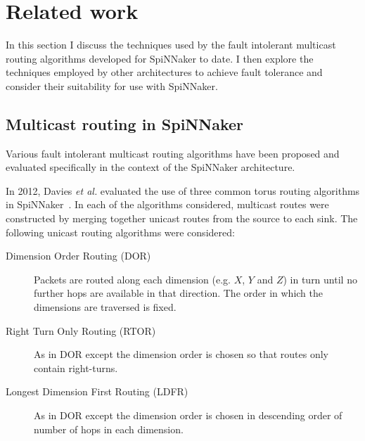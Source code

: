 	\section{Related work}
		
		In this section I discuss the techniques used by the fault intolerant
		multicast routing algorithms developed for SpiNNaker to date. I then
		explore the techniques employed by other architectures to achieve fault
		tolerance and consider their suitability for use with SpiNNaker.
		
		\subsection{Multicast routing in SpiNNaker}
			
			Various fault intolerant multicast routing algorithms have been
			proposed and evaluated specifically in the context of the SpiNNaker
			architecture.
			
			In 2012, Davies \emph{et al.} evaluated the use of three common torus
			routing algorithms in SpiNNaker~\cite{davies12}. In each of the
			algorithms considered, multicast routes were constructed by merging
			together unicast routes from the source to each sink. The following
			unicast routing algorithms were considered:
			
			\begin{description}
				
				\item[Dimension Order Routing (DOR)] Packets are routed along each
				dimension (e.g. $X$, $Y$ and $Z$) in turn until no further hops are
				available in that direction.  The order in which the dimensions are
				traversed is fixed.
				
				\item[Right Turn Only Routing (RTOR)] As in DOR except the dimension
				order is chosen so that routes only contain right-turns.
				
				\item[Longest Dimension First Routing (LDFR)] As in DOR except the
				dimension order is chosen in descending order of number of hops in each
				dimension.
				
			\end{description}
			
